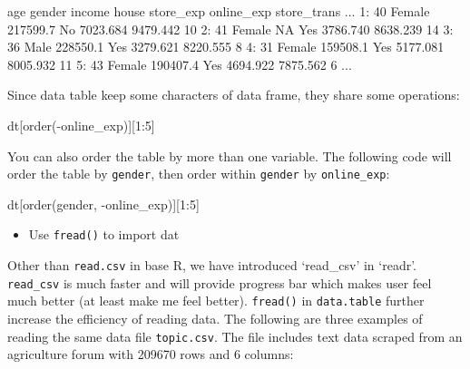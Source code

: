 \documentclass[
  12pt,
]{krantz}
\makeatletter
\newenvironment{Shaded}{\begin{snugshade}}{\end{snugshade}}
\newcommand{\DecValTok}[1]{\textcolor[rgb]{0.06,0.06,0.06}{#1}}
\newcommand{\FunctionTok}[1]{\textcolor[rgb]{0,0,0}{#1}}
\newcommand{\NormalTok}[1]{#1}
\newcommand{\SpecialCharTok}[1]{\textcolor[rgb]{0,0,0}{#1}}
\providecommand{\tightlist}{%
  \setlength{\itemsep}{0pt}\setlength{\parskip}{0pt}}
\newenvironment{kframe}{%
\medskip{}
\setlength{\fboxsep}{.8em}
 \def\at@end@of@kframe{}%
 \ifinner\ifhmode%
  \def\at@end@of@kframe{\end{minipage}}%
  \begin{minipage}{\columnwidth}%
 \fi\fi%
 \def\FrameCommand##1{\hskip\@totalleftmargin \hskip-\fboxsep
 \colorbox{shadecolor}{##1}\hskip-\fboxsep
     \hskip-\linewidth \hskip-\@totalleftmargin \hskip\columnwidth}%
 \MakeFramed {\advance\hsize-\width
   \@totalleftmargin\z@ \linewidth\hsize
   \@setminipage}}%
 {\par\unskip\endMakeFramed%
 \at@end@of@kframe}
\renewenvironment{Shaded}{\begin{kframe}}{\end{kframe}}
\makeatother
\begin{document}
\begin{Shaded}
\begin{Highlighting}[]
\NormalTok{   age gender   income house store\_exp online\_exp store\_trans ...}
\NormalTok{1:  40 Female 217599.7    No  7023.684   9479.442          10}
\NormalTok{2:  41 Female       NA   Yes  3786.740   8638.239          14}
\NormalTok{3:  36   Male 228550.1   Yes  3279.621   8220.555           8}
\NormalTok{4:  31 Female 159508.1   Yes  5177.081   8005.932          11}
\NormalTok{5:  43 Female 190407.4   Yes  4694.922   7875.562           6}
\NormalTok{...}
\end{Highlighting}
\end{Shaded}

Since data table keep some characters of data frame, they share some operations:

\begin{Shaded}
\begin{Highlighting}[]
\NormalTok{dt[}\FunctionTok{order}\NormalTok{(}\SpecialCharTok{{-}}\NormalTok{online\_exp)][}\DecValTok{1}\SpecialCharTok{:}\DecValTok{5}\NormalTok{]}
\end{Highlighting}
\end{Shaded}

You can also order the table by more than one variable. The following code will order the table by \texttt{gender}, then order within \texttt{gender} by \texttt{online\_exp}:

\begin{Shaded}
\begin{Highlighting}[]
\NormalTok{dt[}\FunctionTok{order}\NormalTok{(gender, }\SpecialCharTok{{-}}\NormalTok{online\_exp)][}\DecValTok{1}\SpecialCharTok{:}\DecValTok{5}\NormalTok{]}
\end{Highlighting}
\end{Shaded}

\begin{itemize}
\tightlist
\item
  Use \texttt{fread()} to import dat
\end{itemize}

Other than \texttt{read.csv} in base R, we have introduced `read\_csv' in `readr'. \texttt{read\_csv} is much faster and will provide progress bar which makes user feel much better (at least make me feel better). \texttt{fread()} in \texttt{data.table} further increase the efficiency of reading data. The following are three examples of reading the same data file \texttt{topic.csv}. The file includes text data scraped from an agriculture forum with 209670 rows and 6 columns:
\end{document}
